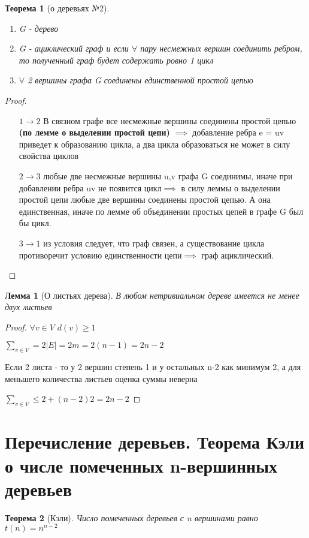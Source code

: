 \documentclass[a4paper]{article}
\newtheorem{theorem}{Теорема}[section]
\newtheorem{lemma}{Лемма}[section]
\theoremstyle{definition}
\theoremstyle{remark}
\begin{document}
\begin{multicols*}{2}
\begin{theorem}[о деревьях №2]
\begin{enumerate}
            \item G - дерево
            \item G - ациклический граф и если $\forall$ пару несмежных вершин соединить ребром, то
            полученный граф будет содержать ровно 1 цикл
            \item $\forall$ 2 вершины графа G соединены единственной простой цепью
        \end{enumerate}
    \end{theorem}
    \begin{proof}
        \begin{itemize}
            \item[$1\to 2$] В связном графе все несмежные вершины соединены простой цепью \textbf{(по лемме о выделении простой цепи)}
            $\implies$ добавление ребра e = uv приведет к образованию цикла, а два цикла образоваться не может в силу свойства циклов
            \item[$2 \to 3$] любые две несмежные вершины u,v графа G соединимы, иначе при добавлении ребра uv не появится цикл$\implies$
            в силу леммы о выделении простой цепи любые две вершины соединены простой цепью. А она единственная, иначе по лемме об 
            объединении простых цепей в графе G был бы цикл.
            \item[$3\to1$]из условия следует, что граф связен, а существование цикла противоречит условию единственности цепи$\implies$
            граф ациклический.
        \end{itemize}
    \end{proof}
    \begin{lemma}[О листьях дерева]
        В любом нетривиальном дереве имеется не менее двух листьев
    \end{lemma}
    \begin{proof}
        $\forall v\in V$ $d(v)\geq 1$

        $\sum_{v\in V} = 2|E|=2m=2(n-1)=2n-2$

        Если 2 листа - то у 2 вершин степень 1 и у остальных n-2 как минимум 2,
        а для меньшего количества листьев оценка суммы неверна

        $\sum_{v\in V} \leq 2 + (n-2)2 = 2n - 2$
    \end{proof}
    \section{Перечисление деревьев. Теорема Кэли о числе помеченных n-вершинных деревьев}
    \begin{theorem}[Кэли]
        Число помеченных деревьев с n вершинами равно $t(n) = n^{n-2}$
    \end{theorem}

\end{multicols*}
\end{document}
